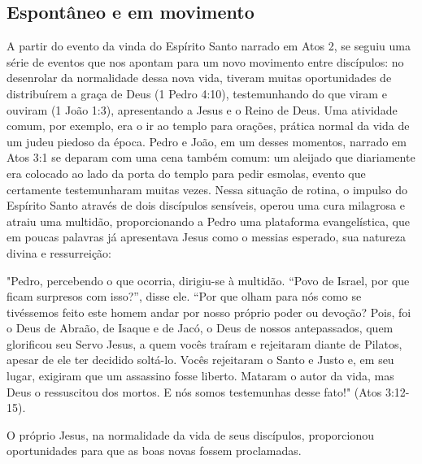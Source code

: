 \documentclass[12pt,openright,oneside,a4paper]{abntex2}
\begin{document}

\subsection{Espontâneo e em movimento}

A partir do evento da vinda do Espírito Santo narrado em Atos 2, se seguiu uma série de eventos que nos apontam para um novo movimento entre discípulos: no desenrolar da normalidade dessa nova vida, tiveram muitas oportunidades de distribuírem a graça de Deus (1 Pedro 4:10), testemunhando do que viram e ouviram (1 João 1:3), apresentando a Jesus e o Reino de Deus. Uma atividade comum, por exemplo, era o ir ao templo para orações, prática normal da vida de um judeu piedoso da época. Pedro e João, em um desses momentos, narrado em Atos 3:1 se deparam com uma cena também comum: um aleijado que diariamente era colocado ao lado da porta do templo para pedir esmolas, evento que certamente testemunharam muitas vezes. Nessa situação de rotina, o impulso do Espírito Santo através de dois discípulos sensíveis, operou uma cura milagrosa e atraiu uma multidão, proporcionando a Pedro uma plataforma evangelística, que em poucas palavras já apresentava Jesus como o messias esperado, sua natureza divina e ressurreição:

\begin{citacao}
	"Pedro, percebendo o que ocorria, dirigiu-se à multidão. “Povo de Israel, por que ficam surpresos com isso?”, disse ele. “Por que olham para nós como se tivéssemos feito este homem andar por nosso próprio poder ou devoção? Pois, foi o Deus de Abraão, de Isaque e de Jacó, o Deus de nossos antepassados, quem glorificou seu Servo Jesus, a quem vocês traíram e rejeitaram diante de Pilatos,	apesar de ele ter decidido soltá-lo. Vocês rejeitaram o Santo e Justo e, em seu lugar, exigiram que um assassino fosse liberto. Mataram o autor da vida, mas Deus o ressuscitou dos mortos. E nós somos testemunhas desse fato!" (Atos 3:12-15).
\end{citacao}

O próprio Jesus, na normalidade da vida de seus discípulos, proporcionou oportunidades para que as boas novas fossem proclamadas.
\end{document}
